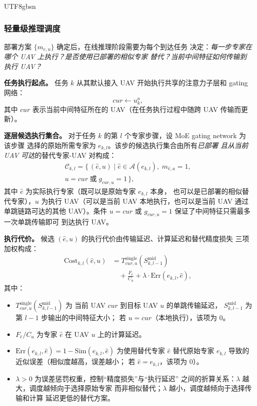 \documentclass[conference]{IEEEtran}
\begin{document}
\begin{CJK*}{UTF8}{gbsn}
\subsubsection{轻量级推理调度}
\label{sec:inference_scheduling}

部署方案 $\{m_{e,u}\}$ 确定后，在线推理阶段需要为每个到达任务
决定：\emph{每一步专家在哪个 UAV 上执行？是否使用已部署的相似专家
替代？当前中间特征如何传输到执行 UAV？}

\textbf{任务执行起点。}
任务 $k$ 从其默认接入 UAV 开始执行共享的注意力子层和 gating 网络：
\begin{equation}
cur \leftarrow u_k^a,
\label{eq:cur_init}
\end{equation}
其中 $cur$ 表示当前中间特征所在的 UAV（在任务执行过程中随跨 UAV
传输而更新）。

\textbf{逐层候选执行集合。}
对于任务 $k$ 的第 $l$ 个专家步骤，设 MoE gating network 为该步骤
选择的原始所需专家为 $e_{k,l}$。该步的候选执行集合由所有\emph{已部署
且从当前 UAV 可达}的替代专家-UAV 对构成：
\begin{multline}
\mathcal{C}_{k,l} = \{\,(\hat{e}, u) \mid
\hat{e} \in \mathcal{A}(e_{k,l}),\;
m_{\hat{e},u} = 1,\\[2pt]
u = cur \;\text{或}\; g_{cur,u} = 1\,\},
\label{eq:candidate_exec}
\end{multline}
其中 $\hat{e}$ 为实际执行专家（既可以是原始专家 $e_{k,l}$ 本身，
也可以是已部署的相似替代专家），$u$ 为执行 UAV（可以是当前 UAV
本地执行，也可以是当前 UAV 通过单跳链路可达的其他 UAV）。条件
$u=cur$ 或 $g_{cur,u}=1$ 保证了中间特征只需最多一次单跳传输即可
到达执行 UAV。

\textbf{执行代价。}
候选 $(\hat{e},u)$ 的执行代价由传输延迟、计算延迟和替代精度损失
三项加权构成：
\begin{equation}
\begin{aligned}
\mathrm{Cost}_{k,l}(\hat{e},u) &=
T_{cur,u}^{\mathrm{single}}\!\left(S_{k,l-1}^{\mathrm{mid}}\right) \\
&\quad + \frac{F_{\hat{e}}}{C_u}
+ \lambda \cdot \mathrm{Err}(e_{k,l}, \hat{e}),
\end{aligned}
\label{eq:cost}
\end{equation}
其中：
\begin{itemize}
  \item $T_{cur,u}^{\mathrm{single}}(S_{k,l-1}^{\mathrm{mid}})$ 为
        当前 UAV $cur$ 到目标 UAV $u$ 的单跳传输延迟，
        $S_{k,l-1}^{\mathrm{mid}}$ 为第 $l-1$ 步输出的中间特征大小；
        若 $u=cur$（本地执行），该项为 $0$。
  \item $F_{\hat{e}}/C_u$ 为专家 $\hat{e}$ 在 UAV $u$ 上的计算延迟。
  \item $\mathrm{Err}(e_{k,l},\hat{e}) =
        1 - \mathrm{Sim}(e_{k,l},\hat{e})$ 为使用替代专家 $\hat{e}$
        替代原始专家 $e_{k,l}$ 导致的近似误差（相似度越高，误差越小；
        若 $\hat{e}=e_{k,l}$，该项为 $0$）。
  \item $\lambda > 0$ 为误差惩罚权重，控制``精度损失''与``执行延迟''
        之间的折算关系：$\lambda$ 越大，调度越倾向于选择原始专家
        而非相似替代；$\lambda$ 越小，调度越倾向于选择传输和计算
        延迟更低的替代方案。
\end{itemize}


\end{CJK*}
\end{document}

